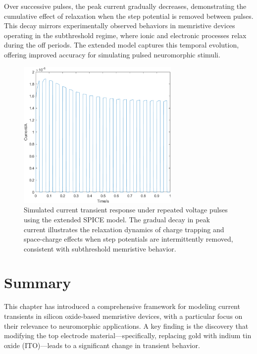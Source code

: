 \noindent Over successive pulses, the peak current gradually decreases, demonstrating the cumulative effect of relaxation when the step potential is removed between pulses. This decay mirrors experimentally observed behaviors in memristive devices operating in the subthreshold regime, where ionic and electronic processes relax during the off periods. The extended model captures this temporal evolution, offering improved accuracy for simulating pulsed neuromorphic stimuli.
\begin{figure}[htbp!] 
    \centering    
    \includegraphics[width=0.7\textwidth]{Chapter5/Figs/j.png}
    \caption[Simulated current transient response under repeated voltage pulses using the extended SPICE model.]{Simulated current transient response under repeated voltage pulses using the extended SPICE model. The gradual decay in peak current illustrates the relaxation dynamics of charge trapping and space-charge effects when step potentials are intermittently removed, consistent with subthreshold memristive behavior.}
    \label{fig:5j}
\end{figure}

\section[Summary]{Summary}

\noindent This chapter has introduced a comprehensive framework for modeling current transients in silicon oxide-based memristive devices, with a particular focus on their relevance to neuromorphic applications. A key finding is the discovery that modifying the top electrode material—specifically, replacing gold with indium tin oxide (ITO)—leads to a significant change in transient behavior. \\


